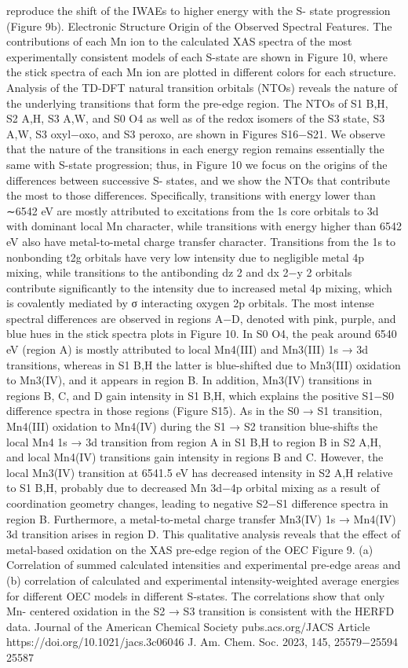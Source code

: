 \documentclass{article}
\begin{document}
reproduce the shift of the IWAEs to higher energy with the S-
state progression (Figure 9b).
Electronic Structure Origin of the Observed Spectral
Features. The contributions of each Mn ion to the calculated
XAS spectra of the most experimentally consistent models of
each S-state are shown in Figure 10, where the stick spectra of
each Mn ion are plotted in different colors for each structure.
Analysis of the TD-DFT natural transition orbitals (NTOs)
reveals the nature of the underlying transitions that form the
pre-edge region. The NTOs of S1
B,H, S2
A,H, S3
A,W, and S0
O4 as
well as of the redox isomers of the S3 state, S3
A,W, S3
oxyl−oxo, and
S3
peroxo, are shown in Figures S16−S21. We observe that the
nature of the transitions in each energy region remains
essentially the same with S-state progression; thus, in Figure 10
we focus on the origins of the differences between successive S-
states, and we show the NTOs that contribute the most to
those differences.
Specifically, transitions with energy lower than ∼6542 eV are
mostly attributed to excitations from the 1s core orbitals to 3d
with dominant local Mn character, while transitions with
energy higher than 6542 eV also have metal-to-metal charge
transfer character. Transitions from the 1s to nonbonding t2g
orbitals have very low intensity due to negligible metal 4p
mixing, while transitions to the antibonding dz
2 and dx
2−y
2
orbitals contribute significantly to the intensity due to
increased metal 4p mixing, which is covalently mediated by
σ interacting oxygen 2p orbitals. The most intense spectral
differences are observed in regions A−D, denoted with pink,
purple, and blue hues in the stick spectra plots in Figure 10.
In S0
O4, the peak around 6540 eV (region A) is mostly
attributed to local Mn4(III) and Mn3(III) 1s → 3d transitions,
whereas in S1
B,H the latter is blue-shifted due to Mn3(III)
oxidation to Mn3(IV), and it appears in region B. In addition,
Mn3(IV) transitions in regions B, C, and D gain intensity in
S1
B,H, which explains the positive S1−S0 difference spectra in
those regions (Figure S15).
As in the S0 → S1 transition, Mn4(III) oxidation to
Mn4(IV) during the S1 → S2 transition blue-shifts the local
Mn4 1s → 3d transition from region A in S1
B,H to region B in
S2
A,H, and local Mn4(IV) transitions gain intensity in regions B
and C. However, the local Mn3(IV) transition at 6541.5 eV
has decreased intensity in S2
A,H relative to S1
B,H, probably due
to decreased Mn 3d−4p orbital mixing as a result of
coordination geometry changes, leading to negative S2−S1
difference spectra in region B. Furthermore, a metal-to-metal
charge transfer Mn3(IV) 1s → Mn4(IV) 3d transition arises in
region D. This qualitative analysis reveals that the effect of
metal-based oxidation on the XAS pre-edge region of the OEC
Figure 9. (a) Correlation of summed calculated intensities and
experimental pre-edge areas and (b) correlation of calculated and
experimental intensity-weighted average energies for different OEC
models in different S-states. The correlations show that only Mn-
centered oxidation in the S2 → S3 transition is consistent with the
HERFD data.
Journal of the American Chemical Society
pubs.acs.org/JACS
Article
https://doi.org/10.1021/jacs.3c06046
J. Am. Chem. Soc. 2023, 145, 25579−25594
25587
\end{document}
